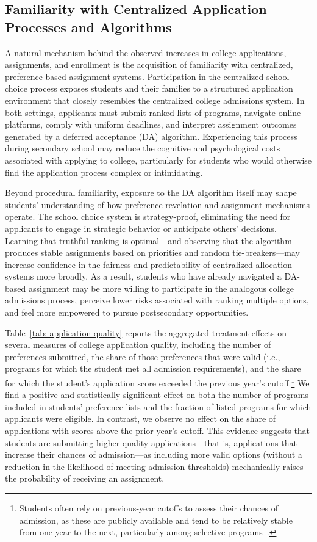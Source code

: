 \documentclass[11pt]{article}
\begin{document}
\subsection{Familiarity with Centralized Application Processes and Algorithms}
A natural mechanism behind the observed increases in college applications, assignments, and enrollment is the acquisition of familiarity with centralized, preference-based assignment systems. Participation in the centralized school choice process exposes students and their families to a structured application environment that closely resembles the centralized college admissions system. In both settings, applicants must submit ranked lists of programs, navigate online platforms, comply with uniform deadlines, and interpret assignment outcomes generated by a deferred acceptance (DA) algorithm. Experiencing this process during secondary school may reduce the cognitive and psychological costs associated with applying to college, particularly for students who would otherwise find the application process complex or intimidating.

Beyond procedural familiarity, exposure to the DA algorithm itself may shape students' understanding of how preference revelation and assignment mechanisms operate. The school choice system is strategy-proof, eliminating the need for applicants to engage in strategic behavior or anticipate others' decisions. Learning that truthful ranking is optimal---and observing that the algorithm produces stable assignments based on priorities and random tie-breakers---may increase confidence in the fairness and predictability of centralized allocation systems more broadly. As a result, students who have already navigated a DA-based assignment may be more willing to participate in the analogous college admissions process, perceive lower risks associated with ranking multiple options, and feel more empowered to pursue postsecondary opportunities.

Table~\ref{tab: application quality} reports the aggregated treatment effects on several measures of college application quality, including the number of preferences submitted, the share of those preferences that were valid (i.e., programs for which the student met all admission requirements), and the share for which the student's application score exceeded the previous year's cutoff.\footnote{Students often rely on previous-year cutoffs to assess their chances of admission, as these are publicly available and tend to be relatively stable from one year to the next, particularly among selective programs~\citep{larroucau2024}.} We find a positive and statistically significant effect on both the number of programs included in students' preference lists and the fraction of listed programs for which applicants were eligible. In contrast, we observe no effect on the share of applications with scores above the prior year's cutoff. This evidence suggests that students are submitting higher-quality applications---that is, applications that increase their chances of admission---as including more valid options (without a reduction in the likelihood of meeting admission thresholds) mechanically raises the probability of receiving an assignment.
\end{document}
